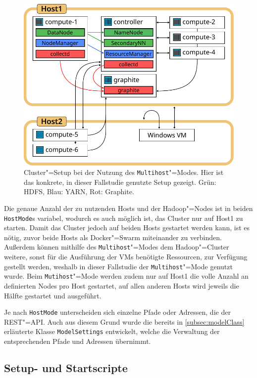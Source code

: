 \begin{figure}[h]
    \includegraphics{./resources/caseStudyHadoopSetup.pdf}
    \caption[Cluster"=Setup bei der Nutzung des Multihost"=Modes]
    {Cluster"=Setup bei der Nutzung des \texttt{Multihost}"=Modes.
    Hier ist das konkrete, in dieser Fallstudie genutzte Setup gezeigt.
    Grün: HDFS, Blau: YARN, Rot: Graphite.}
    \label{fig:caseStudyHadoopSetup}
\end{figure}

Die genaue Anzahl der zu nutzenden Hosts und der Hadoop"=Nodes ist in beiden \texttt{HostMode}s variabel, wodurch es auch möglich ist, das Cluster nur auf Host1 zu starten.
Damit das Cluster jedoch auf beiden Hosts gestartet werden kann, ist es nötig, zuvor beide Hosts als Docker"=Swarm miteinander zu verbinden.
Außerdem können mithilfe des \texttt{Multihost}"=Modes dem Hadoop"=Cluster weitere, sonst für die Ausführung der VMs benötigte Ressourcen, zur Verfügung gestellt werden, weshalb in dieser Fallstudie der \texttt{Multihost}"=Mode genutzt wurde.
Beim \texttt{Mutihost}"=Mode werden zudem nur auf Host1 die volle Anzahl an definierten Nodes pro Host gestartet, auf allen anderen Hosts wird jeweils die Hälfte gestartet und ausgeführt.

Je nach \texttt{HostMode} unterscheiden sich einzelne Pfade oder Adressen, \zB die der REST"=API.
Auch aus diesem Grund wurde die bereits in \cref{subsec:modelClass} erläuterte Klasse \texttt{ModelSettings} entwickelt, welche die Verwaltung der entsprechenden Pfade und Adressen übernimmt.

\subsection{Setup- und Startscripte}
\label{subsec:scripts}

